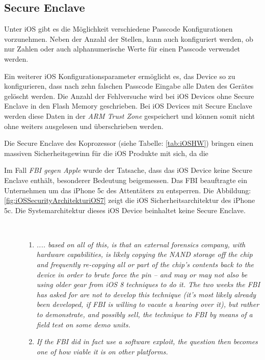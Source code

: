\subsection{Secure Enclave}
\label{sec:Frage1SecureEnclave}
 
 Unter iOS gibt es die Möglichkeit verschiedene Passcode Konfigurationen vorzunehmen. Neben der Anzahl der Stellen, kann auch konfiguriert werden, ob nur Zahlen oder auch alphanumerische Werte für einen Passcode verwendet werden.\par 
 Ein weiterer iOS Konfigurationsparameter ermöglicht es, das Device so zu konfigurieren, dass nach zehn falschen Passcode Eingabe alle Daten des Gerätes gelöscht werden. Die Anzahl der Fehlversuche wird bei iOS Devices ohne Secure Enclave in den Flash Memory geschrieben. Bei iOS Devices mit Secure Enclave werden diese Daten in der \textit{\glqq ARM Trust Zone\grqq{}} gespeichert und können somit nicht ohne weiters ausgelesen und überschrieben werden. 
 
 Die Secure Enclave des Koprozessor (siehe Tabelle: \ref{tab:iOSHW}) bringen einen massiven Sicherheitsgewinn für die iOS Produkte mit sich, da die  
 
 Im Fall \textit{\glqq FBI gegen Apple\grqq{}} wurde der Tatsache, dass das iOS Device keine Secure Enclave enthält, besonderer Bedeutung beigemessen. Das FBI beauftragte ein Unternehmen um das iPhone 5c des Attentäters zu entsperren. Die Abbildung: \ref{fig:iOSSecurityArchitekturiOS7} zeigt die iOS Sicherheitsarchitektur des iPhone 5c. Die Systemarchitektur dieses iOS Device beinhaltet keine Secure Enclave. \par 
\begin{description}
    \item[\parbox{\textwidth} { Der Sicherheitsforscher Zdziarski beschreibt in seinen Abhandlungen die plausiblen Varianten des FBI Hacks wie folgt}]~\par
    \begin{enumerate}
        \item \textit{\glqq .... based on all of this, is that an external forensics company, with hardware capabilities, is likely copying the NAND storage off the chip and frequently re-copying all or part of the chip’s contents back to the device in order to brute force the pin – and may or may not also be using older gear from iOS 8 techniques to do it. The two weeks the FBI has asked for are not to develop this technique (it’s most likely already been developed, if FBI is willing to vacate a hearing over it), but rather to demonstrate, and possibly sell, the technique to FBI by means of a field test on some demo units.\grqq{}} \cite{Hacking[4]}
        \item \textit{\glqq If the FBI did in fact use a software exploit, the question then becomes one of how viable it is on other platforms.\grqq{}} \cite{Hacking[4]}
    \end{enumerate}
\end{description} 

